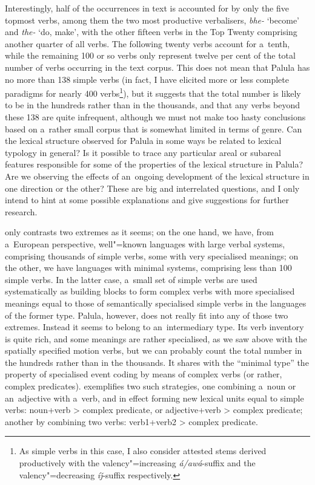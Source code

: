 Interestingly, half of the occurrences in text is accounted for by only the five topmost verbs, among them the two most productive verbalisers, \textit{bhe-} `become' and \textit{the-} `do, make', with the other fifteen verbs in the Top Twenty comprising another quarter of all verbs. The following twenty verbs account for a~tenth, while the remaining 100 or so verbs only represent twelve per cent of the total number of verbs occurring in the text corpus. This does not mean that Palula has no more than 138 simple verbs (in fact, I have elicited more or less complete paradigms for nearly 400 verbs\footnote{As simple verbs in this case, I also consider attested stems derived productively with the valency"=increasing \textit{á/awá}-suffix and the valency"=decreasing \textit{íǰ}-suffix respectively.}), but it suggests that the total number is likely to be in the hundreds rather than in the thousands, and that any verbs beyond these 138 are quite infrequent, although we must not make too hasty conclusions based on a~rather small corpus that is somewhat limited in terms of genre. Can the lexical structure observed for Palula in some ways be related to lexical typology in general? Is it possible to trace any particular areal or subareal features responsible for some of the properties of the lexical structure in Palula? Are we observing the effects of an~ongoing development of the lexical structure in one direction or the other? These are big and interrelated questions, and I only intend to hint at some possible explanations and give suggestions for further research.



\citet[409]{viberg2006} only contrasts two extremes as it seems; on the one hand, we have, from a~European perspective, well"=known languages with large verbal systems, comprising thousands of simple verbs, some with very specialised meanings; on the other, we have languages with minimal systems, comprising less than 100 simple verbs. In the latter case, a~small set of simple verbs are used systematically as building blocks to form complex verbs with more specialised meanings equal to those of semantically specialised simple verbs in the languages of the former type. Palula, however, does not really fit into any of those two extremes. Instead it seems to belong to an~intermediary type. Its verb inventory is quite rich, and some meanings are rather specialised, as we saw above with the spatially specified motion verbs, but we can probably count the total number in the hundreds rather than in the thousands. It shares with the ``minimal type'' the property of specialised event coding by means of complex verbs (or rather, complex predicates). \citet[348]{viberg2006} exemplifies two such strategies, one combining a~noun or an~adjective with a~verb, and in effect forming new lexical units equal to simple verbs: noun+verb {\textgreater} complex predicate, or adjective+verb {\textgreater} complex predicate; another by combining two verbs: verb1+verb2 {\textgreater} complex predicate. 



